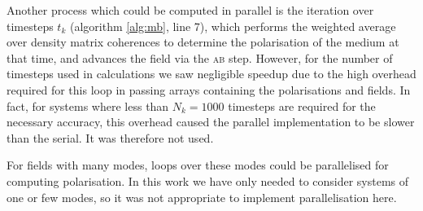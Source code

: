     Another process which could be computed in parallel is the iteration over
    timesteps $t_k$ (algorithm \ref{alg:mb}, line 7), which performs the
    weighted average over density matrix coherences to determine the
    polarisation of the medium at that time, and advances the field via the
    \textsc{ab} step. However, for the number of timesteps used in calculations
    we saw negligible speedup due to the high overhead required for this loop in
    passing arrays containing the polarisations and fields. In fact, for systems
    where less than $N_k = 1000$ timesteps are required for the necessary
    accuracy, this overhead caused the parallel implementation to be slower
    than the serial. It was therefore not used.

    For fields with many modes, loops over these modes could be parallelised for
    computing polarisation. In this work we have only needed to consider systems
    of one or few modes, so it was not appropriate to implement parallelisation
    here.
